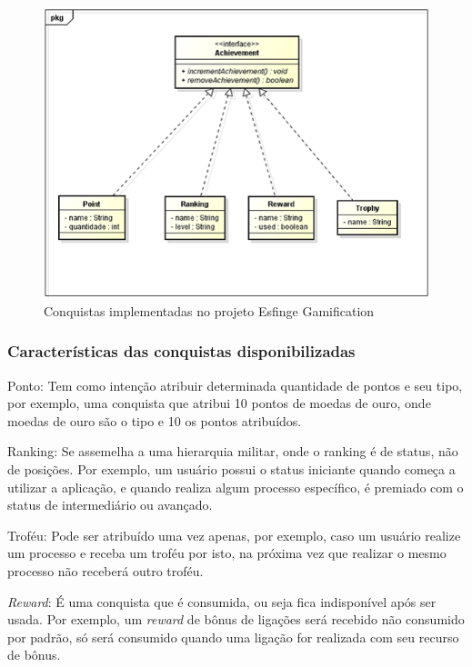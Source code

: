 \begin{figure}[H]
    \centering
    \includegraphics{src/imagens/cap2/estrutura-conquistas.png}
    \caption{Conquistas implementadas no projeto Esfinge Gamification}
    \label{fig:arquitetura-esfinge-gamification}
\end{figure}

\subsubsection{Características das conquistas disponibilizadas}

\par Ponto: Tem como intenção atribuir determinada quantidade de pontos e seu tipo, por exemplo, uma conquista que atribui 10 pontos de moedas de ouro, onde moedas de ouro são o tipo e 10 os pontos atribuídos. 
\par Ranking: Se assemelha a uma hierarquia militar, onde o ranking é de status, não de posições. Por exemplo, um usuário possui o status iniciante quando começa a utilizar a aplicação, e quando realiza algum processo específico, é premiado com o status de intermediário ou avançado.

\par Troféu: Pode ser atribuído uma vez apenas, por exemplo, caso um usuário realize um processo e receba um troféu por isto, na próxima vez que realizar o mesmo processo não receberá outro troféu.

\par \textit{Reward}: É uma conquista que é consumida, ou seja fica indisponível após ser usada. Por exemplo, um \textit{reward} de bônus de ligações será recebido não consumido por padrão, só será consumido quando uma ligação for realizada com seu recurso de bônus.

